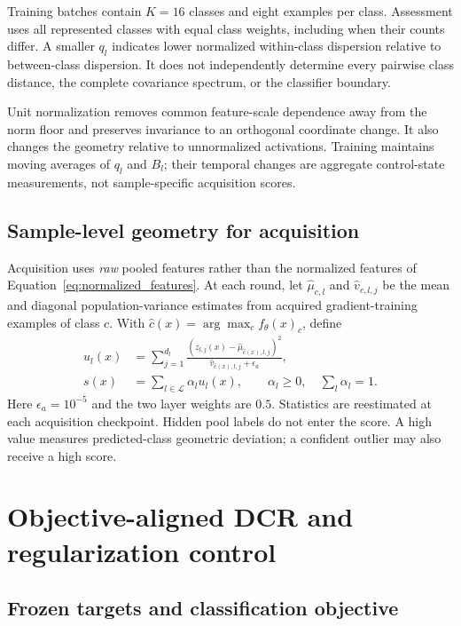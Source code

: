 \documentclass[a4paper,fleqn]{cas-dc}
\begin{document}
Training batches contain $K=16$ classes and eight examples per class.
Assessment uses all represented classes with equal class weights,
including when their counts differ. A smaller $q_l$ indicates
lower normalized within-class dispersion relative to between-class
dispersion. It does not independently determine every pairwise
class distance, the complete covariance spectrum, or the classifier
boundary.

Unit normalization removes common feature-scale dependence away
from the norm floor and preserves invariance to an orthogonal
coordinate change. It also changes the geometry relative to
unnormalized activations. Training maintains moving averages of
$q_l$ and $B_l$; their temporal changes are aggregate control-state
measurements, not sample-specific acquisition scores.

\subsection{Sample-level geometry for acquisition}

Acquisition uses \emph{raw} pooled features rather than the normalized
features of Equation~\eqref{eq:normalized_features}.
At each round, let $\widehat\mu_{c,l}$ and
$\widehat v_{c,l,j}$ be the mean and diagonal population-variance
estimates from acquired gradient-training examples of class $c$.
With $\widehat c(x)=\arg\max_c f_\theta(x)_c$, define
\begin{align}
 u_l(x)&=
 \sum_{j=1}^{d_l}
 \frac{(z_{l,j}(x)-\widehat\mu_{\widehat c(x),l,j})^2}
 {\widehat v_{\widehat c(x),l,j}+\epsilon_a},\\
 s(x)&=\sum_{l\in\mathcal L}\alpha_l u_l(x),
 \qquad \alpha_l\ge0,\quad\sum_l\alpha_l=1.
 \label{eq:acquisition}
\end{align}
Here $\epsilon_a=10^{-5}$ and the two layer weights are $0.5$.
Statistics are reestimated at each acquisition checkpoint.
Hidden pool labels do not enter the score. A high value measures
predicted-class geometric deviation; a confident outlier may also
receive a high score.

\section{Objective-aligned DCR and regularization control}
\label{sec:framework}

\subsection{Frozen targets and classification objective}
\end{document}
